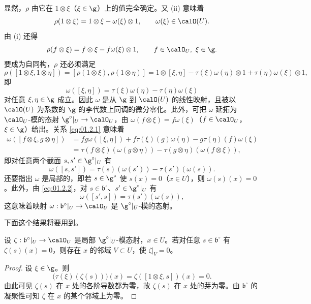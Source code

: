 显然，$\rho$ 由它在 $1\otimes\xi$（$\xi\in\g$）上的值完全确定。又 (ii) 意味着
$$\rho(1\otimes\xi)=1\otimes\xi-\omega(\xi)\otimes 1,\qquad \omega(\xi)\in\calO(U).$$
由 (i) 还得
$$\rho(f\otimes\xi)=f\otimes\xi-f\omega(\xi)\otimes 1,\qquad f\in\calO_U,\ \xi\in\g.$$
要成为自同构，$\rho$ 还必须满足
$$\rho([1\otimes\xi,1\otimes\eta])=[\rho(1\otimes\xi),\rho(1\otimes\eta)]=1\otimes[\xi,\eta]-\tau(\xi)\omega(\eta)\otimes 1+\tau(\eta)\omega(\xi)\otimes 1,$$
即
\begin{equation}\label{eq:01.2.1}
\omega([\xi,\eta])=\tau(\xi)\omega(\eta)-\tau(\eta)\omega(\xi)
\end{equation}
对任意 $\xi,\eta\in\g$ 成立。因此 $\omega$ 是从 $\g$ 到 $\calO(U)$ 的线性映射，且被以 $\calO(U)$ 为系数的 $\g$ 的李代数上同调的微分零化。此外，可把 $\omega$ 延拓为 $\calO_U$-模的态射 $\g^\circ|_U\to\calO_U$，由 $\omega(f\otimes\xi)=f\omega(\xi)$（$f\in\calO_U$，$\xi\in\g$）给出。关系 \eqref{eq:01.2.1} 意味着
\begin{align*}
\omega([f\otimes\xi,g\otimes\eta])&=fg\omega([\xi,\eta])+f\tau(\xi)(g)\omega(\eta)-g\tau(\eta)(f)\omega(\xi)\\
&=\tau(f\otimes\xi)(\omega(g\otimes\eta))-\tau(g\otimes\eta)(\omega(f\otimes\xi)),
\end{align*}
即对任意两个截面 $s,s'\in\g^\circ|_U$ 有
\begin{equation}\label{eq:01.2.2}
\omega([s,s'])=\tau(s)(\omega(s'))-\tau(s')(\omega(s)).
\end{equation}
还要指出 $\omega$ 是局部的，即若 $s\in\g^\circ$ 使 $s(x)=0$（$x\in U$），则 $\omega(s)(x)=0$。此外，由 \eqref{eq:01.2.2}，对 $s\in\mathfrak{b}^\circ$、$s'\in\g^\circ|_U$ 有
$$\omega([s',s])=\tau(s')(\omega(s)),$$
这意味着映射 $\omega:\mathfrak{b}^\circ|_U\to\calO_U$ 是 $\g^\circ|_U$-模的态射。

下面这个结果将要用到。

\begin{lemma}\label{lem:01.2.5}
设 $\zeta:\mathfrak{b}^\circ|_U\to\calO_U$ 是局部 $\g^\circ|_U$-模态射，$x\in U$。若对任意 $s\in\mathfrak{b}^\circ$ 有 $\zeta(s)(x)=0$，则存在 $x$ 的邻域 $V\subset U$，使 $\zeta|_V=0$。
\end{lemma}

\begin{proof}
设 $\xi\in\g$。则
$$\bigl(\tau(\xi)(\zeta(s))\bigr)(x)=\zeta([1\otimes\xi,s])(x)=0.$$
由此可见 $\zeta(s)$ 在 $x$ 处的各阶导数都为零，故 $\zeta(s)$ 在 $x$ 处的芽为零。由 $\mathfrak{b}^\circ$ 的凝聚性可知 $\zeta$ 在 $x$ 的某个邻域上为零。
\end{proof}

